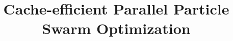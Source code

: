\documentclass{article}
\title{Cache-efficient Parallel Particle Swarm Optimization}
\begin{document}
\maketitle
\begin{abstract}
  
\end{abstract}
\end{document}
